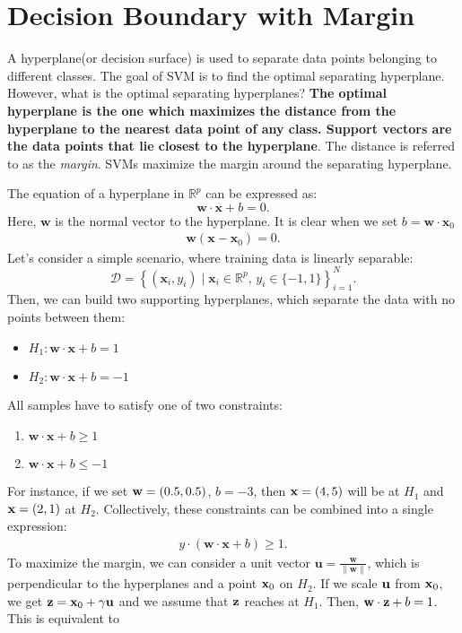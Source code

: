 \section{Decision Boundary with Margin}
A hyperplane(or decision surface) is used to separate data points belonging to different classes. The goal of SVM is to find the optimal separating hyperplane. However, what is the optimal separating hyperplanes? \textbf{The optimal hyperplane is the one which maximizes the distance from the hyperplane to the nearest data point of any class. Support vectors are the data points that lie closest to the hyperplane}. The distance is referred to as the \textit{margin}. SVMs maximize the margin around the separating hyperplane.

The equation of a hyperplane in $\mathbb{R}^p$ can be expressed as:
$$\mathbf{w}\cdot \mathbf{x}+b=0.$$
Here, $\mathbf{w}$ is the normal vector to the hyperplane. It is clear when we set $b = \mathbf{w}\cdot\mathbf{x}_0$
\begin{align*}
	\mathbf{w}(\mathbf{x}-\mathbf{x}_0)=0.
\end{align*}
Let's consider a simple scenario, where training data is linearly separable: 
$$\mathcal{D} = \left\{ (\mathbf{x}_i, y_i)\mid\mathbf{x}_i \in \mathbb{R}^p,\, y_i \in \{-1,1\}\right\}_{i=1}^N.$$
Then, we can build two supporting hyperplanes, which separate the data with no points between them:
\begin{itemize}
	\item $H_1:\mathbf{w}\cdot \mathbf{x}+b=1$
	\item $H_2:\mathbf{w}\cdot \mathbf{x}+b=-1$
\end{itemize}
All samples have to satisfy one of two constraints:
\begin{enumerate}
	\item $\mathbf{w}\cdot \mathbf{x}+b\geq1$
	\item $\mathbf{w}\cdot \mathbf{x}+b\leq-1$
\end{enumerate}
For instance, if we set ${\mathbf{w}} = (0.5, 0.5)$, $b=-3$, then ${\mathbf{x}} = (4,5)$ will be at $H_1$ and ${\mathbf{x}}=(2,1)$ at $H_2$. Collectively, these constraints can be combined into a single expression:
\begin{align*}
	y\cdot (\mathbf{w}\cdot \mathbf{x}+b)\geq 1.
\end{align*}
To maximize the margin, we can consider a unit vector $\mathbf{u} = \frac{\mathbf{w}}{\lVert\mathbf{w}\rVert}$, which is perpendicular to the hyperplanes and a point ${\mathbf{x}}_0$ on $H_2$. If we scale ${\mathbf{u}}$ from ${\mathbf{x}}_0$, we get ${\mathbf{z}} = {\mathbf{x}}_0+\gamma{\mathbf{u}}$ and we assume that ${\mathbf{z}}$ reaches at $H_1$. Then, $\mathbf{w}\cdot {\mathbf{z}} +b=1$. This is equivalent to 
